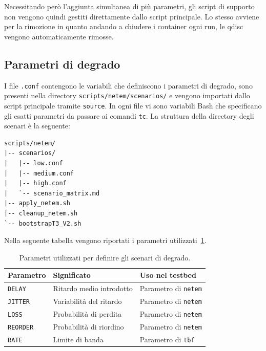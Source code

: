 Necessitando però l'aggiunta simultanea di più parametri, gli script di supporto non
vengono quindi gestiti direttamente dallo script principale. Lo stesso avviene per
la rimozione in quanto andando a chiudere i container ogni run, le qdisc vengono automaticamente
rimosse.

\subsection{Parametri di degrado}

I file \texttt{.conf} contengono le variabili che definiscono i parametri di degrado,
sono presenti nella directory \texttt{scripts/netem/scenarios/} e vengono importati
dallo script principale tramite \texttt{source}. In ogni file vi sono variabili Bash
che specificano gli esatti parametri da passare ai comandi \texttt{tc}. La struttura
della directory degli scenari è la seguente:

\begin{lstlisting}[caption={Organizzazione dei file di scenario.},label={lst:scenario-directory}]
scripts/netem/
|-- scenarios/
|   |-- low.conf
|   |-- medium.conf
|   |-- high.conf
|   `-- scenario_matrix.md
|-- apply_netem.sh
|-- cleanup_netem.sh
`-- bootstrapT3_V2.sh
\end{lstlisting}

Nella seguente tabella vengono riportati i parametri utilizzati~\ref{tab:parametri-degrado}.

\begin{table}[H]
  \centering
  \begin{tabular}{lll}
    \hline
    \textbf{Parametro} & \textbf{Significato}     & \textbf{Uso nel testbed}    \\
    \hline
    \texttt{DELAY}     & Ritardo medio introdotto & Parametro di \texttt{netem} \\
    \texttt{JITTER}    & Variabilità del ritardo  & Parametro di \texttt{netem} \\
    \texttt{LOSS}      & Probabilità di perdita   & Parametro di \texttt{netem} \\
    \texttt{REORDER}   & Probabilità di riordino  & Parametro di \texttt{netem} \\
    \texttt{RATE}      & Limite di banda          & Parametro di \texttt{tbf}   \\
    \hline
  \end{tabular}
  \caption{Parametri utilizzati per definire gli scenari di degrado.}
  \label{tab:parametri-degrado}
\end{table}

